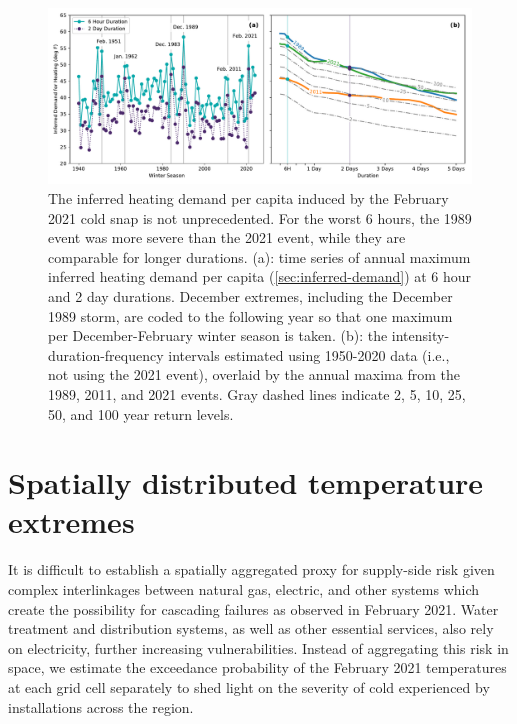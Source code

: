 \documentclass[12pt]{iopart}
\begin{document}
\begin{figure}
  \centering
  \includegraphics[width=\textwidth]{ERCOT_HDD_IDF_MLE_popweighted.pdf}
  \caption{
    The inferred heating demand per capita induced by the February 2021 cold snap is not unprecedented.
    For the worst 6 hours, the 1989 event was more severe than the 2021 event, while they are comparable for longer durations.
    (a): time series of annual maximum inferred heating demand per capita (\cref{sec:inferred-demand}) at 6 hour and 2 day durations.
    December extremes, including the December 1989 storm, are coded to the following year so that one maximum per December-February winter season is taken.
    (b): the intensity-duration-frequency intervals estimated using 1950-2020 data (i.e., not using the 2021 event), overlaid by the annual maxima from the 1989, 2011, and 2021 events.
    Gray dashed lines indicate 2, 5, 10, 25, 50, and 100 year return levels.
  }\label{fig:idf_weighted}
\end{figure}

\section{Spatially distributed temperature extremes}\label{sec:res-spatial}

It is difficult to establish a spatially aggregated proxy for supply-side risk given complex interlinkages between natural gas, electric, and other systems which create the possibility for cascading failures as observed in February 2021.
Water treatment and distribution systems, as well as other essential services, also rely on electricity, further increasing vulnerabilities.
Instead of aggregating this risk in space, we estimate the exceedance probability of the February 2021 temperatures at each grid cell separately to shed light on the severity of cold experienced by installations across the region.
\end{document}
